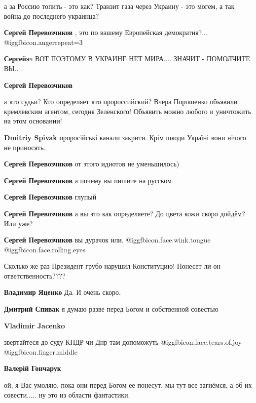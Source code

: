 \begin{itemize}
\begin{itemize}
а за Россию топить - это как? Транзит газа через Украину - это могем, а так
война до последнего украинца?

\textbf{Сергей Перевозчиков} , это по вашему Европейская демократия?... @igg{fbicon.anger}{repeat=3} 

\textbf{Сергей}яч ВОТ ПОЭТОМУ В УКРАИНЕ НЕТ МИРА.... ЗНАЧИТ - ПОМОЛЧИТЕ ВЫ..

\textbf{Сергей Перевозчиков} 

а кто судьи? Кто определяет кто пророссийский? Вчера Порошенко объявили
кремлевским агентом, сегодня Зеленского! Объявить можно любого и уничтожить на
этом основании!

\textbf{Dmitriy Spivak} проросійські канали закрити. Крім шкоди Україні вони нічого не приносять.

\textbf{Сергей Перевозчиков} от этого идиотов не уменьшилось)

\textbf{Сергей Перевозчиков} а почему вы пишите на русском

\textbf{Сергей Перевозчиков} глупый

\textbf{Сергей Перевозчиков} а вы это как определяете? До цвета кожи скоро дойдём? Или уже?

\textbf{Сергей Перевозчиков} вы дурачок или.  @igg{fbicon.face.wink.tongue}  @igg{fbicon.face.rolling.eyes} 

\end{itemize} %


Сколько же раз Президент грубо нарушил Конституцию! Понесет ли он
ответственность????

\begin{itemize} %
\textbf{Владимир Яценко} Да. И очень скоро.

\textbf{Дмитрий Спивак} я думаю разве перед Богом и собственной совестью

\textbf{Vladimir Jacenko} 

звертайтеся до суду КНДР чи Днр там допоможуть  @igg{fbicon.face.tears.of.joy}
@igg{fbicon.finger.middle} 

\textbf{Валерій Гончарук} 

ой, я Вас умоляю, пока они перед Богом ее понесут, мы тут все загнёмся, а об их
совести..... ну это из области фантастики.


\end{itemize}
\end{itemize}
